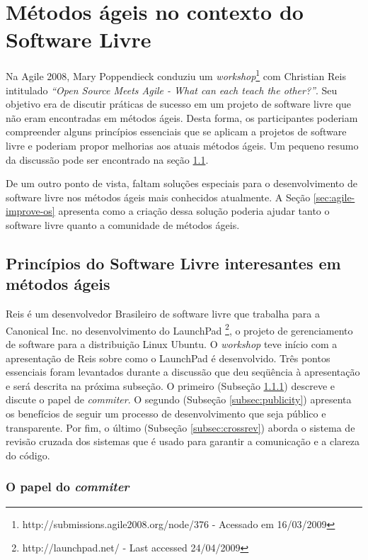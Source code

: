 \chapter{Métodos ágeis no contexto do Software Livre}
\label{cap:agile}

Na Agile 2008, Mary Poppendieck conduziu um
\emph{workshop}\footnote{http://submissions.agile2008.org/node/376 -
  Acessado em 16/03/2009} com Christian Reis intitulado \emph{``Open
  Source Meets Agile - What can each teach the other?''}. Seu objetivo
era de discutir práticas de sucesso em um projeto de software livre
que não eram encontradas em métodos ágeis. Desta forma, os
participantes poderiam compreender alguns princípios essenciais que se
aplicam a projetos de software livre e poderiam propor melhorias aos
atuais métodos ágeis. Um pequeno resumo da discussão pode ser
encontrado na seção \ref{sec:foss-over-agile}.

De um outro ponto de vista, faltam soluções especiais para o
desenvolvimento de software livre nos métodos ágeis mais conhecidos
atualmente. A Seção \ref{sec:agile-improve-os} apresenta como a
criação dessa solução poderia ajudar tanto o software livre quanto a
comunidade de métodos ágeis.

\section{Princípios do Software Livre interesantes em métodos ágeis}
\label{sec:foss-over-agile}

Reis é um desenvolvedor Brasileiro de software livre que trabalha para
a Canonical Inc. no desenvolvimento do LaunchPad
\footnote{http://launchpad.net/ - Last accessed 24/04/2009}, o projeto
de gerenciamento de software para a distribuição Linux Ubuntu. O
\emph{workshop} teve início com a apresentação de Reis sobre como o
LaunchPad é desenvolvido. Três pontos essenciais foram levantados
durante a discussão que deu seqüência à apresentação e será descrita
na próxima subseção. O primeiro (Subseção \ref{subsec:commiter})
descreve e discute o papel de \emph{commiter}.  O segundo (Subseção
\ref{subsec:publicity}) apresenta os benefícios de seguir um processo
de desenvolvimento que seja público e transparente.  Por fim, o último
(Subseção \ref{subsec:crossrev}) aborda o sistema de revisão cruzada
dos sistemas que é usado para garantir a comunicação e a clareza do
código.

\subsection{O papel do \emph{commiter}}
\label{subsec:commiter}

